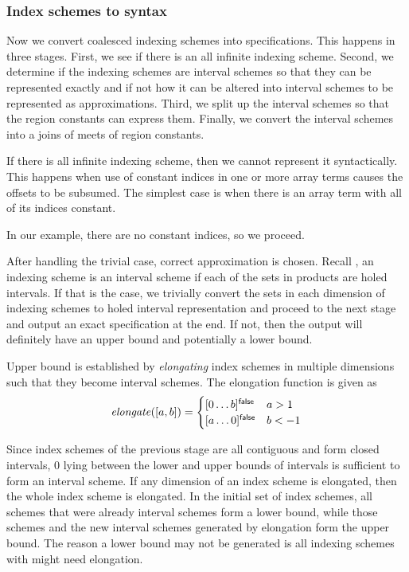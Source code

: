 \subsubsection{Index schemes to syntax}

Now we convert coalesced indexing schemes into specifications. This happens in
three stages. First, we see if there is an all infinite indexing scheme. Second,
we determine if the indexing schemes are interval schemes so that they can be
represented exactly and if not how it can be altered into interval schemes to be
represented as approximations. Third, we split up the interval schemes so that
the region constants can express them. Finally, we convert the interval schemes
into a joins of meets of region constants.

If there is all infinite indexing scheme, then we cannot represent it
syntactically. This happens when use of constant indices in one or more array
terms causes the offsets to be subsumed. The simplest case is when there is an
array term with all of its indices constant.

In our example, there are no constant indices, so we proceed.

After handling the trivial case, correct approximation is chosen. Recall
, an indexing scheme is an interval scheme if each of
the sets in products are holed intervals. If that is the case, we trivially
convert the sets in each dimension of indexing schemes to holed interval
representation and proceed to the next stage and output an exact specification
at the end. If not, then the output will definitely have an upper bound and
potentially a lower bound.

Upper bound is established by \emph{elongating} index schemes in multiple
dimensions such that they become interval schemes. The elongation function is
given as
%
\begin{align*}
  \mathit{elongate}([a,b]) = \begin{cases}
    \textnormal{$\lbrack0\dots b\rbrack^{\textsf{false}}$} & a > 1 \\
    \textnormal{$\lbrack a\dots0\rbrack^{\textsf{false}}$} & b < -1
  \end{cases}
\end{align*}

Since index schemes of the previous stage are all contiguous and form closed
intervals, 0 lying between the lower and upper bounds of intervals is sufficient
to form an interval scheme. If any dimension of an index scheme is elongated,
then the whole index scheme is elongated. In the initial set of index schemes,
all schemes that were already interval schemes form a lower bound, while those
schemes and the new interval schemes generated by elongation form the upper
bound. The reason a lower bound may not be generated is all indexing schemes
with might need elongation.

